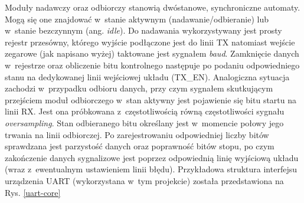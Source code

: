 Moduły nadawczy oraz odbiorczy stanowią dwóstanowe, synchroniczne automaty. Mogą się one znajdować w~stanie aktywnym (nadawanie/odbieranie) lub w~stanie bezczynnym (ang. \textit{idle}). Do nadawania wykorzystywany jest prosty rejestr przesówny, którego wyjście podłączone jest do linii TX natomiast wejście zegarowe (jak napisano wyżej) taktowane jest sygnałem \textit{baud}. Zamknięcie danych w~rejestrze oraz obliczenie bitu kontrolnego następuje po podaniu odpowiedniego stanu na dedykowanej linii wejściowej układu (TX\_EN). Analogiczna sytuacja zachodzi w~przypadku odbioru danych, przy czym sygnałem skutkującym przejściem moduł odbiorczego w~stan aktywny jest pojawienie się bitu startu na linii RX. Jest ona próbkowana z~częstotliwością równą częstotliwości sygnału \textit{oversampling}. Stan odbieranego bitu określany jest w~momencie połowy jego trwania na linii odbiorczej. Po zarejestrowaniu odpowiedniej liczby bitów sprawdzana jest parzystość danych oraz poprawność bitów stopu, po czym zakończenie danych sygnalizowe jest poprzez odpowiednią linię wyjściową układu (wraz z~ewentualnym ustawieniem linii błędu). Przykładowa struktura interfejsu urządzenia UART (wykorzystana w~tym projekcie) została przedstawiona na Rys. \ref{uart-core}
